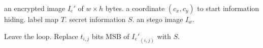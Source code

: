 \begin{algorithm}
	\caption{The data hider embed secret information into encrypted image}
	
	\begin{algorithmic}[1]
		\Require an encrypted image $I_e\prime$ of $w \times h$ bytes.
		\Require a coordinate $(c_x, c_y)$ to start information hiding.
		\Require label map $T$.
		\Require secret information $S$.
		\Ensure an stego image $I_w$.
		
		
		\ForAll{$\{t_{i, j} \mid t_{i, j} \in T, (i = c_x \wedge j \in [c_y, w)) \vee (i \in (c_x, h), j \in [1, w))\}$}
				\State Leave the loop.
			\Else
				\State Replace $t_{i, j}$ bits MSB of ${I_e\prime}_{(i, j)}$ with $S$. 
			\EndIf
		\EndFor
	\end{algorithmic}
\end{algorithm}





